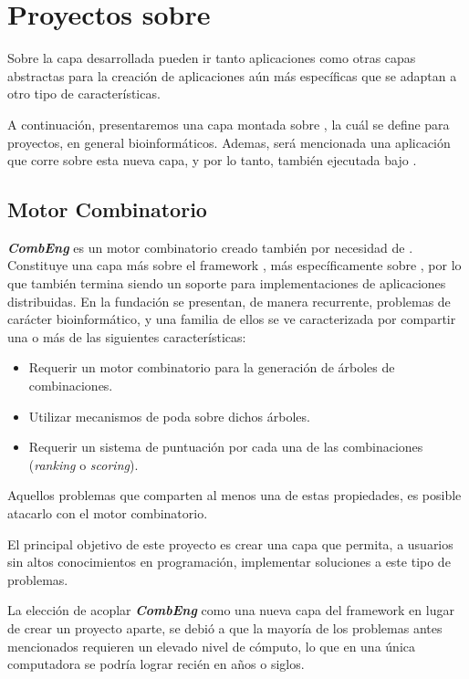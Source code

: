 \chapter{Proyectos sobre \rc}

Sobre la capa desarrollada pueden ir tanto aplicaciones como otras capas abstractas para la creación de aplicaciones aún más específicas
que se adaptan a otro tipo de características.

A continuación, presentaremos una capa montada sobre \rc{}, la cuál se define para proyectos, en general bioinformáticos. Ademas, será
mencionada una aplicación que corre sobre esta nueva capa, y por lo tanto, también ejecutada bajo \rc.

\section{Motor Combinatorio}

\textbf{\textit{CombEng}} es un motor combinatorio creado también por necesidad de \fude. Constituye una capa más sobre el framework \fud,
más específicamente sobre \rc{}, por lo que también termina siendo un soporte para implementaciones de aplicaciones distribuidas. En la
fundación se presentan, de manera recurrente, problemas de carácter bioinformático, y una familia de ellos se ve caracterizada por compartir
una o más de las siguientes características:
\begin{itemize}
    \item Requerir un motor combinatorio para la generación de árboles de combinaciones.
    \item Utilizar mecanismos de poda sobre dichos árboles.
    \item Requerir un sistema de puntuación por cada una de las combinaciones (\textit{ranking} o \textit{scoring}).
\end{itemize}
Aquellos problemas que comparten al menos una de estas propiedades, es posible atacarlo con el motor combinatorio.

El principal objetivo de este proyecto es crear una capa que permita, a usuarios sin altos conocimientos en programación, implementar
soluciones a este tipo de problemas.

La elección de acoplar \textbf{\textit{CombEng}} como una nueva capa del framework \fud{} en lugar de crear un proyecto aparte, se debió a
que la mayoría de los problemas antes mencionados requieren un elevado nivel de cómputo, lo que en una única computadora se podría lograr
recién en años o siglos.


